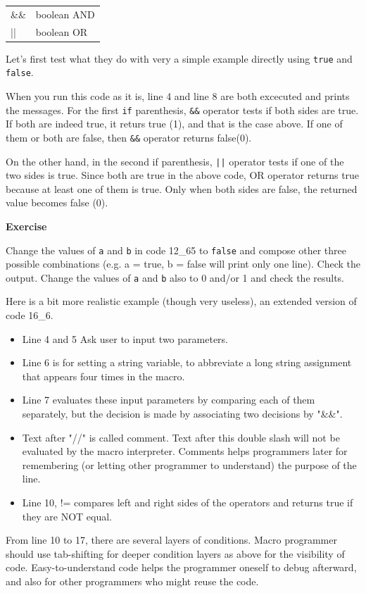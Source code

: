 \documentclass[11pt,a4paper,oneside]{report}
\newenvironment{indentexercise}[1]%
{{\setlength{\leftmargin}{2em}}%
\textbf{Exercise \thesubsection-#1}%
\begin{list}{}%
	\item%
}
{\end{list}}
\newenvironment{indentCom}%
{\begin{list}{}%
         {\setlength{\leftmargin}{1em}}%
         \item[]%
}
{\end{list}}
\newcommand{\ilcom}[1]{\texttt{\small#1}}
\begin{document}
\begin{indentCom}
 \begin{tabular*}{0.5\textwidth}{ l l }
\&\& & boolean AND\\
|| & boolean OR\\
\end{tabular*}
\end{indentCom}

Let's first test what they do with very a simple example directly using
\ilcom{true} and \ilcom{false}.

When you run this code as it is, line 4 and line 8 are both excecuted and prints
the messages. For the first \ilcom{if} parenthesis, \ilcom{&&} operator tests if
both sides are true. If both are indeed true, it returs true (1), and that is
the case above. If one of them or both are false, then \ilcom{&&}
operator returns false(0). 

On the other hand, in the second if parenthesis,
\ilcom{||} operator tests if one of the two sides is true. Since both are
true in the above code, OR operator returns true because at least one of them is
true. Only when both sides are false, the returned value becomes false (0).

\begin{indentexercise}{1}
Change the values of \ilcom{a} and \ilcom{b} in code 12\_65 to \ilcom{false} and
compose other three possible combinations (e.g. a = true, b = false will print
only one line).
Check the output. Change the values of \ilcom{a} and \ilcom{b} also to 0 and/or
1 and check the results. 
\end{indentexercise}

Here is a bit more realistic example (though very useless), an extended version
of code 16\_6.

\begin{itemize}
\item Line 4 and 5 Ask user to input two parameters.
\item Line 6 is for setting a string variable, to abbreviate a long string assignment that appears four times in the macro.
\item Line 7 evaluates these input parameters by comparing each of them separately, but the decision is made by associating two decisions by "\&\&". 
\item Text after "//" is called comment. Text after this double slash will not be evaluated by the macro interpreter. Comments helps programmers later for remembering (or letting other programmer to understand) the purpose of the line. 
\item Line 10, != compares left and right sides of the operators and returns true if they are NOT equal.   
\end{itemize}
From line 10 to 17, there are several layers of conditions. Macro programmer should use tab-shifting for deeper condition layers as above for the visibility of code. Easy-to-understand code helps the programmer oneself to debug afterward, and also for other programmers who might reuse the code.
\end{document}
